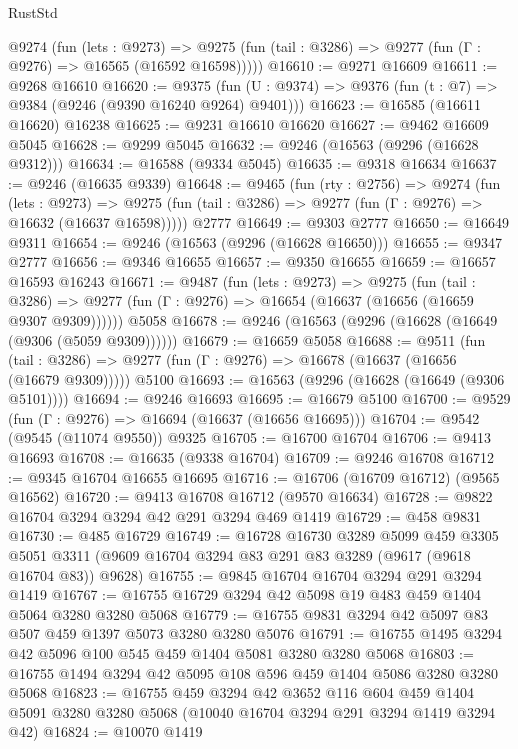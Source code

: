 \begin{lexlean}{RustStd}
\begin{coremodule}
{\begin{coremodule}
{{{{{{{{{{{{{{{{{{{{{{{{{{{{{{{{{    @9274
      (fun (lets : @9273) =>
      @9275 (fun (tail : @3286) => @9277 (fun (Γ : @9276) => @16565 (@16592 @16598)))))
@16610 := @9271 @16609
@16611 := @9268 @16610
@16620 := @9375
    (fun (U : @9374) => @9376 (fun (t : @7) => @9384 (@9246 (@9390 @16240 @9264) @9401)))
@16623 := @16585 (@16611 @16620) @16238
@16625 := @9231 @16610 @16620
@16627 := @9462 @16609 @5045
@16628 := @9299 @5045
@16632 := @9246 (@16563 (@9296 (@16628 @9312)))
@16634 := @16588 (@9334 @5045)
@16635 := @9318 @16634
@16637 := @9246 (@16635 @9339)
@16648 := @9465
    (fun (rty : @2756) =>
    @9274
      (fun (lets : @9273) =>
      @9275 (fun (tail : @3286) => @9277 (fun (Γ : @9276) => @16632 (@16637 @16598)))))
    @2777
@16649 := @9303 @2777
@16650 := @16649 @9311
@16654 := @9246 (@16563 (@9296 (@16628 @16650)))
@16655 := @9347 @2777
@16656 := @9346 @16655
@16657 := @9350 @16655
@16659 := @16657 @16593 @16243
@16671 := @9487
    (fun (lets : @9273) =>
    @9275
      (fun (tail : @3286) =>
      @9277 (fun (Γ : @9276) => @16654 (@16637 (@16656 (@16659 @9307 @9309))))))
    @5058
@16678 := @9246 (@16563 (@9296 (@16628 (@16649 (@9306 (@5059 @9309))))))
@16679 := @16659 @5058
@16688 := @9511
    (fun (tail : @3286) => @9277 (fun (Γ : @9276) => @16678 (@16637 (@16656 (@16679 @9309)))))
    @5100
@16693 := @16563 (@9296 (@16628 (@16649 (@9306 @5101))))
@16694 := @9246 @16693
@16695 := @16679 @5100
@16700 := @9529 (fun (Γ : @9276) => @16694 (@16637 (@16656 @16695)))
@16704 := @9542 (@9545 (@11074 @9550)) @9325
@16705 := @16700 @16704
@16706 := @9413 @16693
@16708 := @16635 (@9338 @16704)
@16709 := @9246 @16708
@16712 := @9345 @16704 @16655 @16695
@16716 := @16706 (@16709 @16712) (@9565 @16562)
@16720 := @9413 @16708 @16712 (@9570 @16634)
@16728 := @9822 @16704 @3294 @3294 @42 @291 @3294 @469 @1419
@16729 := @458 @9831
@16730 := @485 @16729
@16749 := @16728
    @16730
    @3289
    @5099
    @459
    @3305
    @5051
    @3311
    (@9609 @16704 @3294 @83 @291 @83 @3289 (@9617 (@9618 @16704 @83)) @9628)
@16755 := @9845 @16704 @16704 @3294 @291 @3294 @1419
@16767 := @16755 @16729 @3294 @42 @5098 @19 @483 @459 @1404 @5064 @3280 @3280 @5068
@16779 := @16755 @9831 @3294 @42 @5097 @83 @507 @459 @1397 @5073 @3280 @3280 @5076
@16791 := @16755 @1495 @3294 @42 @5096 @100 @545 @459 @1404 @5081 @3280 @3280 @5068
@16803 := @16755 @1494 @3294 @42 @5095 @108 @596 @459 @1404 @5086 @3280 @3280 @5068
@16823 := @16755
    @459
    @3294
    @42
    @3652
    @116
    @604
    @459
    @1404
    @5091
    @3280
    @3280
    @5068
    (@10040 @16704 @3294 @291 @3294 @1419 @3294 @42)
@16824 := @10070 @1419
}}}}}}}}}}}}}}}}}}}}}}}}}}}}}}}}}
\end{coremodule}}
\end{coremodule}
\end{lexlean}
